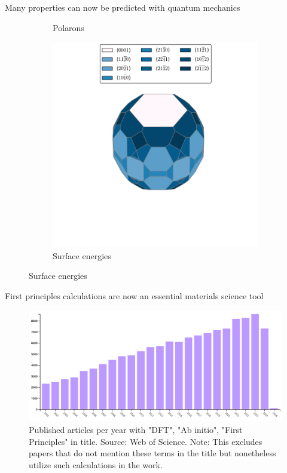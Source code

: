 \documentclass[aspectratio=169]{beamer}
\begin{document}
\begin{frame}{Many properties can now be predicted with quantum mechanics}
\begin{figure}
\begin{subfigure}{0.2\textwidth}
                \caption{Polarons\cite{ongComparisonSmallPolaron2011}}
            \end{subfigure}
            \begin{subfigure}{0.2\textwidth}
                \includegraphics[width=\linewidth]{lectures/figures/1_surfaces.png}
                \caption{Surface energies\cite{tranSurfaceEnergiesElemental2016}}
            \end{subfigure}
        \end{figure}

    \end{frame}


    \begin{frame}{First principles calculations are now an essential materials science tool}
        \begin{figure}
            \centering
            \includegraphics[width=0.8\linewidth]{lectures/figures/1_Papers_per_year.png}
            \caption{Published articles per year with "DFT", "Ab initio", "First Principles" in title. Source: Web of Science. Note: This excludes papers that do not mention these terms in the title but nonetheless utilize such calculations in the work.}
        \end{figure}
    \end{frame}
\end{document}
